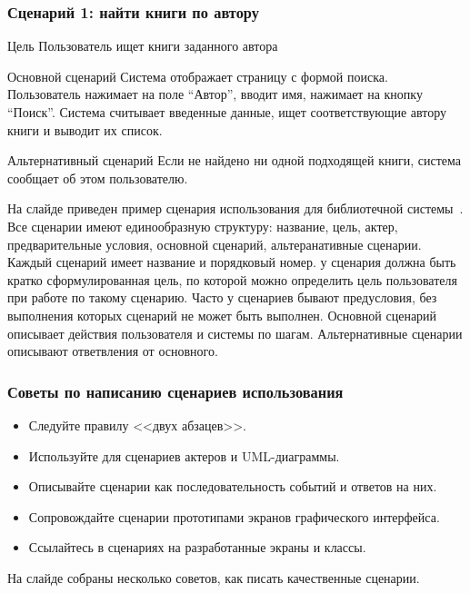 \documentclass{../industrial-development}
\begin{document}
\begin{frame} \frametitle{Сценарий 1: найти книги по автору}
  \begin{block}{Цель}
   Пользователь ищет книги заданного автора
  \end{block}
  \begin{block}{Основной сценарий}
   Система отображает страницу с формой поиска. Пользователь нажимает на поле ``Автор'', вводит имя, нажимает на кнопку ``Поиск''. Система считывает введенные данные, ищет соответствующие автору книги и выводит их список.
  \end{block}
  \begin{block}{Альтернативный сценарий}
    Если не найдено ни одной подходящей книги, система сообщает об этом пользователю.
  \end{block}
\end{frame}

\lecturenotes

На слайде приведен пример сценария использования для библиотечной системы~\cite[143]{Rosenberg}. Все сценарии имеют единообразную структуру: название, цель, актер, предварительные условия, основной сценарий, альтеранативные сценарии. Каждый сценарий имеет название и порядковый номер. у сценария должна быть кратко сформулированная цель, по которой можно определить цель пользователя при работе по такому сценарию. Часто у сценариев бывают предусловия, без выполнения которых сценарий не может быть выполнен. Основной сценарий описывает действия пользователя и системы по шагам. Альтернативные сценарии описывают ответвления от основного.

\begin{frame} \frametitle{Советы по написанию сценариев использования}
 \begin{itemize}
  \item Следуйте правилу <<двух абзацев>>.
  \item Используйте для сценариев актеров и UML-диаграммы.
  \item Описывайте сценарии как последовательность событий и ответов на них.
  \item Сопровождайте сценарии прототипами экранов графического интерфейса.
  \item Ссылайтесь в сценариях на разработанные экраны и классы.
 \end{itemize}
\end{frame}

\lecturenotes

На слайде собраны несколько советов, как писать качественные сценарии.
\end{document}

